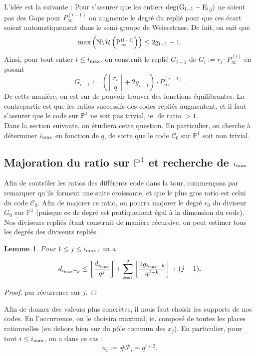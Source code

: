 \documentclass[10pt]{article}
\newtheorem{lem1}{Lemme}[]
\newcommand{\s}{\vspace{0.3cm}}
\newcommand{\cd}{\cdot}
\newcommand{\N}{\mathbb{N}}
\newcommand{\PR}{\mathcal{P}}
\newcommand{\ii}{i_{\rm{max}}}
\begin{document}
L'idée est la suivante : Pour s'assurer que les entiers $\rm{deg}(G_{i-1}-E_{i,j})$ ne soient pas des Gaps pour $P_{\infty}^{(i-1)}$ on augmente le degré du replié pour que ces écart soient automatiquement dans le semi-groupe de Weierstrass. De fait, on sait que 
\[\rm{max}\left(\N \backslash \mathcal{H}\left(P^{(i-1)}_{\infty}\right)\right) \leq 2g_{i-1} -1.\]
Ainsi, pour tout entier $i \leq \ii$, on construit le replié $G_{i-1}$ de $G_i := r_i \cd P^{(i)}_{\infty}$ en posant 
\[G_{i-1} := \left(\left\lfloor \dfrac{r_i}{q} \right\rfloor + 2g_{i-1}\right) \cd P^{(i-1)}_{\infty}.\]
De cette manière, on est sur de pouvoir trouver des fonctions équilibrantes. La contrepartie est que les ratios successifs des codes repliés augmentent, et il faut s'assurer que le code sur $\mathbb{P}^1$ ne soit pas trivial, ie. de ratio $> 1$. \\
Dans la section suivante, on étudiera cette question. En particulier, on cherche à déterminer $\ii$ en fonction de $q$, de sorte que le code $\mathcal{C}_0$ sur $\mathbb{P}^1$ soit non trivial.

\newpage

\subsection{Majoration du ratio sur $\mathbb{P}^1$ et recherche de $\ii$}

\s

Afin de contrôler les ratios des différents code dans la tour, commençons par remarquer qu'ils forment une suite croissante, et que le plus gros ratio est celui du code $\mathcal{C}_0$. Afin de majorer ce ratio, on pourra majorer le degré $r_0$ du diviseur $G_0$ sur $\mathbb{P}^1$ (puisque ce de degré est pratiquement égal à la dimension du code). \\
Nos diviseurs repliés étant construit de manière récursive, on peut estimer tous les degrés des diviseurs repliés.

\begin{lem1}
Pour $1 \leq j \leq \ii$, on a 
\[d_{\ii -j} \leq \left\lfloor \dfrac{d_{\ii}}{q^j}\right\rfloor + \sum\limits_{k=1}^j \left\lfloor \dfrac{2g_{\ii -k}}{q^{j-k}}\right\rfloor + (j-1).\]
\end{lem1}

\begin{proof}
par récurrence sur $j$.
\end{proof}

Afin de donner des valeurs plus concrètes, il nous faut choisir les supports de nos codes. En l'occurrence, on le choisira maximal, ie. composé de toutes les places rationnelles (en dehors bien sur du pôle commun des $x_j$). En particulier, pour tout $i \leq \ii$, on a dans ce cas :
\[n_i := \#\PR_i = q^{i+2}.\]
\end{document}
